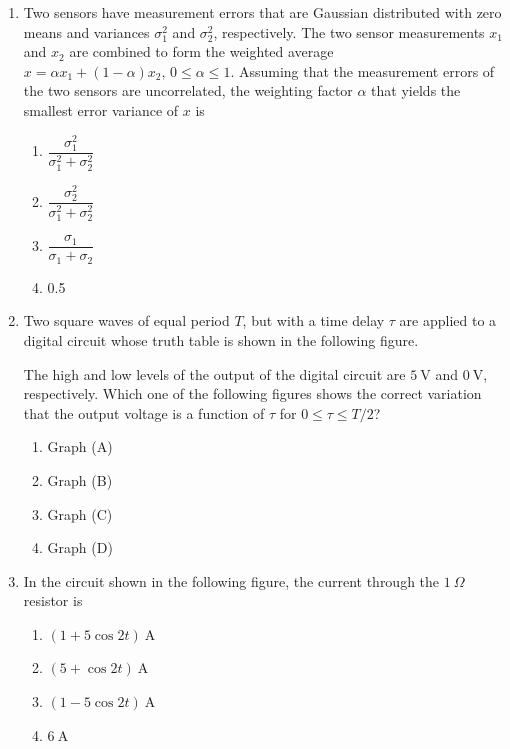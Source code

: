 \documentclass[journal]{IEEEtran}
\begin{document}
\begin{enumerate}
\item Two sensors have measurement errors that are Gaussian distributed with zero means and variances $\sigma_1^2$ and $\sigma_2^2$, respectively. The two sensor measurements $x_1$ and $x_2$ are combined to form the weighted average $x = \alpha x_1 + (1-\alpha)x_2, \, 0 \leq \alpha \leq 1$. Assuming that the measurement errors of the two sensors are uncorrelated, the weighting factor $\alpha$ that yields the smallest error variance of $x$ is  
\begin{multicols}{4}
\begin{enumerate}
\item $\dfrac{\sigma_1^2}{\sigma_1^2 + \sigma_2^2}$  
\item $\dfrac{\sigma_2^2}{\sigma_1^2 + \sigma_2^2}$  
\item $\dfrac{\sigma_1}{\sigma_1 + \sigma_2}$  
\item 0.5  
\end{enumerate}
\end{multicols}

\item Two square waves of equal period $T$, but with a time delay $\tau$ are applied to a digital circuit whose truth table is shown in the following figure.  

The high and low levels of the output of the digital circuit are $5\ \mathrm{V}$ and $0\ \mathrm{V}$, respectively. Which one of the following figures shows the correct variation that the output voltage is a function of $\tau$ for $0 \leq \tau \leq T/2$?

\begin{multicols}{2}
\begin{enumerate}
\item Graph (A)  
\item Graph (B)  
\item Graph (C)  
\item Graph (D)  
\end{enumerate}
\end{multicols}

\item In the circuit shown in the following figure, the current through the $1\ \Omega$ resistor is

\begin{multicols}{2}
\begin{enumerate}
\item $(1+5\cos 2t)\ \mathrm{A}$  
\item $(5+\cos 2t)\ \mathrm{A}$  
\item $(1-5\cos 2t)\ \mathrm{A}$  
\item $6\ \mathrm{A}$  
\end{enumerate}
\end{multicols}


\end{enumerate}
\end{document}
